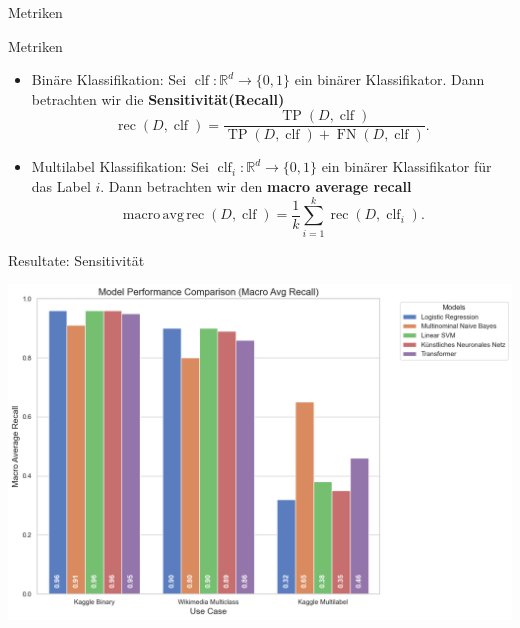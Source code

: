 \documentclass[aspectratio=169]{beamer} %
\newcommand{\clf}{\operatorname{clf}}
\newcommand{\rec}{\operatorname{rec}}
\newcommand{\tp}{\operatorname{TP}}
\newcommand{\fn}{\operatorname{FN}}
\begin{document}
\begin{frame}{Metriken}
    \begin{block}{Metriken}
        \begin{itemize}
            \item Binäre Klassifikation: Sei $\clf\colon \mathbb{R}^d\to \{0, 1\}$ ein binärer Klassifikator. Dann betrachten wir die  \textbf{Sensitivität(Recall)}
                  \begin{equation*}
                      \rec(D, \clf) = \frac{\tp(D, \clf)}{\tp(D, \clf) + \fn(D, \clf)}.
                  \end{equation*}

            \item Multilabel Klassifikation: Sei $\clf_i\colon\mathbb{R}^d\to\{0, 1\}$ ein binärer Klassifikator für das Label $i$. Dann betrachten wir den \textbf{macro average recall}
                  \begin{equation*}
                      \operatorname{macro\,avg\,rec}(D, \clf) = \frac{1}{k}\sum_{i=1}^k\rec (D, \clf_i).
                  \end{equation*}
        \end{itemize}
    \end{block}
\end{frame}

\begin{frame}{Resultate: Sensitivität}
    \begin{center}
        \includegraphics[scale=0.35]{figures/macro_avg_recall_usecases.png}
    \end{center}
\end{frame}
\end{document}
